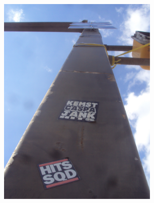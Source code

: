 \documentclass[10pt,letterpaper]{article}
\begin{document}
\vspace{0.25in}
\includegraphics[height=4in]{portrait.jpg}

\pagebreak
\end{document}
